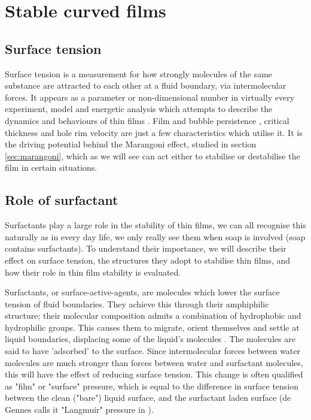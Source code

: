 \documentclass[a4paper,12pt]{article}
\numberwithin{equation}{section}
\numberwithin{figure}{section}
\numberwithin{table}{section}
\begin{document}
\newpage
\section{Stable curved films}
\subsection{Surface tension}
Surface tension is a measurement for how strongly molecules of the same substance are attracted to each other at a fluid boundary, via intermolecular forces. It appears as a parameter or non-dimensional number in virtually every experiment, model and energetic analysis which attempts to describe the dynamics and behaviours of thin films \cite{Ida1998}. Film and bubble persistence \cite{Modini2013}, critical thickness \cite{Manev1974, Lhuissier2011} and hole rim velocity \cite{Culick1960} are just a few characteristics which utilise it. It is the driving potential behind the Marangoni effect, studied in section \ref{sec:marangoni}, which as we will see can act either to stabilise or destabilise the film in certain situations.


\subsection{Role of surfactant}
Surfactants play a large role in the stability of thin films, we can all recognise this naturally as in every day life, we only really see them when soap is involved (soap contains surfactants). To understand their importance, we will describe their effect on surface tension, the structures they adopt to stabilise thin films, and how their role in thin film stability is evaluated.

Surfactants, or surface-active-agents, are molecules which lower the surface tension of fluid boundaries. They achieve this through their amphiphilic structure; their molecular composition admits a combination of hydrophobic and hydrophilic groups. This causes them to migrate, orient themselves and settle at liquid boundaries, displacing some of the liquid's molecules \cite{Gast1997}. The molecules are said to have 'adsorbed' to the surface. Since intermolecular forces between water molecules are much stronger than forces between water and surfactant molecules, this will have the effect of reducing surface tension. This change is often qualified as "film" or "surface" pressure, which is equal to the difference in surface tension between the clean ("bare") liquid surface, and the surfactant laden surface \cite{Bhamla2017} (de Gennes calls it "Langmuir" pressure in \cite{deGennesYoung2001}).  %
\end{document}
